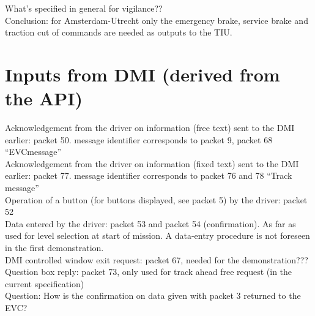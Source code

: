 \documentclass{template/openetcs_report}
\begin{document}
What's specified in general for vigilance??\\

Conclusion: for Amsterdam-Utrecht only the emergency brake, service brake and traction cut of commands are needed as outputs to the TIU.\\

\section{Inputs from DMI (derived from the API)}

Acknowledgement from the driver on information (free text) sent to the DMI earlier: packet 50.
message identifier corresponds to packet 9, packet 68 “EVCmessage”\\

Acknowledgement from the driver on information (fixed text) sent to the DMI earlier: packet 77.
message identifier corresponds to packet 76 and 78 “Track message”\\

Operation of a button (for buttons displayed, see packet 5) by the driver: packet 52\\

Data entered by the driver: packet 53 and packet 54 (confirmation). As far as used for level selection at start of mission. A data-entry procedure is not foreseen in the first demonstration.\\

DMI controlled window exit request: packet 67,   needed for the demonstration???\\

Question box reply: packet 73, only used for track ahead free request (in the current specification)\\


Question: How is the confirmation on data given with packet 3 returned to the EVC?\\
\end{document}
